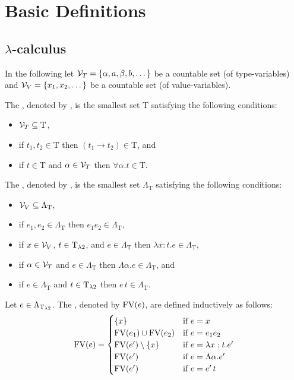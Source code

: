 \section{Basic Definitions}
\subsection{$\lambda$-calculus \lambdaTwo}
In the following let $\mathcal{V}_T=\{\alpha,a,\beta,b,\dots\}$ be a countable set (of type-variables) and $\mathcal{V}_V=\{x_1,x_2,\dots\}$ be a countable set (of value-variables).
\begin{definition}
	The , denoted by \lambdaTypes{}, is the smallest set T satisfying the following conditions: %
	\begin{itemize}
		\item $\mathcal{V}_T\subseteq\text{T}$,
		\item if $t_1,t_2\in\text{T}$ then $(t_1\to t_2)\in\text{T}$, and
		\item if $t\in\text{T}$ and $\alpha\in\mathcal{V}_T$ then $\forall\alpha.t\in\text{T}$.
	\end{itemize}
	
	The , denoted by \lambdaTerms{}, is the smallest set $\Lambda_\text{T}$ satisfying the following conditions: %
	\begin{itemize}
		\item $\mathcal{V}_V\subseteq\Lambda_\text{T}$,
		\item if $e_1,e_2\in\Lambda_\text{T}$ then $e_1e_2\in\Lambda_\text{T}$,
		\item if $x\in\mathcal{V}_V$, $t\in\text{T}_{\lambda2}$, and $e\in\Lambda_\text{T}$ then $\lambda x:t.e\in\Lambda_\text{T}$,
		\item if $\alpha\in\mathcal{V}_T$ and $e\in\Lambda_\text{T}$ then $\Lambda \alpha.e\in\Lambda_\text{T}$, and
		\item if $e\in\Lambda_\text{T}$ and $t\in\text{T}_{\lambda2}$ then $e\,t\in\Lambda_\text{T}$.
	\end{itemize}
\end{definition}
\begin{definition}
	Let $e\in\Lambda_{\text{T}_{\lambda2}}$. The , denoted by $\text{FV}(e)$, are defined inductively as follows:
	\[\FV(e)=
		\begin{cases}
			\{x\}                 & \text{if $e=x$}                \\ %
			\FV(e_1)\cup\FV(e_2)  & \text{if $e=e_1e_2$}           \\
			\FV(e')\setminus\{x\} & \text{if $e=\lambda x:t.e'$}   \\
			\FV(e')               & \text{if $e=\Lambda\alpha.e'$} \\
			\FV(e')               & \text{if $e=e'\,t$}            \\
		\end{cases}\]
\end{definition}
